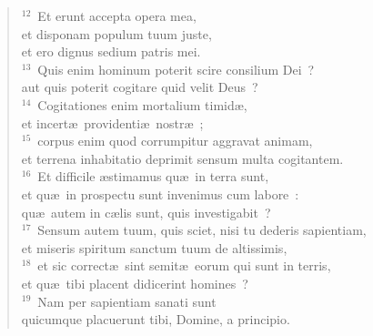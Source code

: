 \begin{verse}
${}^{12}$~Et erunt accepta opera mea,\\ et disponam populum tuum juste,\\ et ero dignus sedium patris mei.\\
${}^{13}$~Quis enim hominum poterit scire consilium Dei~?\\ aut quis poterit cogitare quid velit Deus~?\\
${}^{14}$~Cogitationes enim mortalium timid\ae ,\\ et incert\ae\ providenti\ae\ nostr\ae~;\\
${}^{15}$~corpus enim quod corrumpitur aggravat animam,\\ et terrena inhabitatio deprimit sensum multa cogitantem.\\
${}^{16}$~Et difficile \ae stimamus qu\ae\ in terra sunt,\\ et qu\ae\ in prospectu sunt invenimus cum labore~:\\ qu\ae\ autem in c\ae lis sunt, quis investigabit~?\\
${}^{17}$~Sensum autem tuum, quis sciet, nisi tu dederis sapientiam,\\ et miseris spiritum sanctum tuum de altissimis,\\
${}^{18}$~et sic correct\ae\ sint semit\ae\ eorum qui sunt in terris,\\ et qu\ae\ tibi placent didicerint homines~?\\
${}^{19}$~Nam per sapientiam sanati sunt\\ quicumque placuerunt tibi, Domine, a principio.\end{verse}


